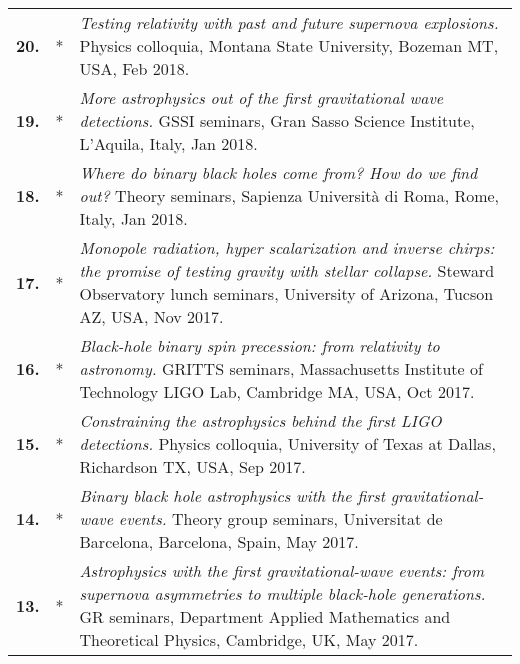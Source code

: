 \documentclass[a4paper]{moderncv}
\begin{document}
{\begin{longtable}{rp{0.4cm}p{15.8cm}}
%
\textbf{20.} & *& \textit{Testing relativity with past and future supernova explosions.}
\newline{} 
Physics colloquia, Montana State University, Bozeman MT, USA, Feb 2018.
\vspace{0.05cm}\\
%
\textbf{19.} & *& \textit{More astrophysics out of the first gravitational wave detections.}
\newline{} 
GSSI seminars, Gran Sasso Science Institute, L'Aquila, Italy, Jan 2018.
\vspace{0.05cm}\\
%
\textbf{18.} & *& \textit{Where do binary black holes come from? How do we find out?}
\newline{} 
Theory seminars, Sapienza Universit\`a di Roma, Rome, Italy, Jan 2018.
\vspace{0.05cm}\\
%
\textbf{17.} & *& \textit{Monopole radiation, hyper scalarization and inverse chirps: the promise of testing gravity with stellar collapse.}
\newline{} 
Steward Observatory lunch seminars, University of Arizona, Tucson AZ, USA, Nov 2017.
\vspace{0.05cm}\\
%
\textbf{16.} & *& \textit{Black-hole binary spin precession: from relativity to astronomy.}
\newline{} 
GRITTS seminars, Massachusetts Institute of Technology LIGO Lab, Cambridge MA, USA, Oct 2017.
\vspace{0.05cm}\\
%
\textbf{15.} & *& \textit{Constraining the astrophysics behind the first LIGO detections.}
\newline{} 
Physics colloquia, University of Texas at Dallas, Richardson TX, USA, Sep 2017.
\vspace{0.05cm}\\
%
\textbf{14.} & *& \textit{Binary black hole astrophysics with the first gravitational-wave events.}
\newline{} 
Theory group seminars, Universitat de Barcelona, Barcelona, Spain, May 2017.
\vspace{0.05cm}\\
%
\textbf{13.} & *& \textit{Astrophysics with the first gravitational-wave events: from supernova asymmetries to multiple black-hole generations.}
\newline{} 
GR seminars, Department Applied Mathematics and Theoretical Physics, Cambridge, UK, May 2017.

\end{longtable}}
\end{document}
